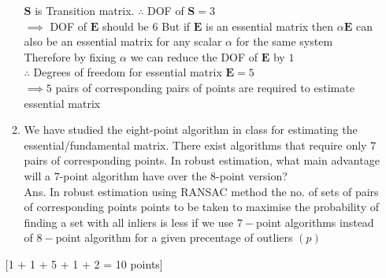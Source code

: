 \documentclass[11pt]{article}
\begin{document}
\begin{enumerate}
\begin{enumerate}
$\textbf{S}$ is Transition matrix. $\therefore$ DOF of $\textbf{S} = 3$\\
$\implies$ DOF of $\textbf{E}$ should be $6$ But if $\textbf{E}$ is an essential matrix then $\alpha\textbf{E}$ can also be an essential matrix  for any scalar $\alpha$ for the same system \\
Therefore by fixing $\alpha$ we can reduce the DOF of $\textbf{E}$ by $1$\\
$\therefore$ Degrees of freedom for essential matrix $\textbf{E} = 5$\\
$\implies 5$ pairs of corresponding pairs of points are required to estimate essential matrix
\item We have studied the eight-point algorithm in class for estimating the essential/fundamental matrix. There exist algorithms that require only 7 pairs of corresponding points. In robust estimation, what main advantage will a 7-point algorithm have over the 8-point version? \\
Ans. In robust estimation using RANSAC method the no. of sets of pairs of corresponding points points to be taken to maximise the probability of finding  a set with all inliers is less if we use $7-$point algorithms instead of $8-$point algorithm for a given precentage of outliers $(p)$
\end{enumerate}
\textsf{[1 + 1 + 5 + 1 + 2 = 10 points]}


\end{enumerate}
\end{document}
